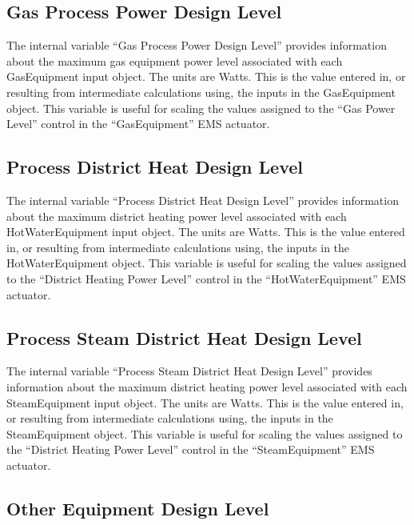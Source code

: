 \subsection{Gas Process Power Design Level}\label{gas-process-power-design-level}

The internal variable ``Gas Process Power Design Level'' provides information about the maximum gas equipment power level associated with each GasEquipment input object. The units are Watts. This is the value entered in, or resulting from intermediate calculations using, the inputs in the GasEquipment object. This variable is useful for scaling the values assigned to the ``Gas Power Level'' control in the ``GasEquipment'' EMS actuator.

\subsection{Process District Heat Design Level}\label{process-district-heat-design-level}

The internal variable ``Process District Heat Design Level'' provides information about the maximum district heating power level associated with each HotWaterEquipment input object. The units are Watts. This is the value entered in, or resulting from intermediate calculations using, the inputs in the HotWaterEquipment object. This variable is useful for scaling the values assigned to the ``District Heating Power Level'' control in the ``HotWaterEquipment'' EMS actuator.

\subsection{Process Steam District Heat Design Level}\label{process-steam-district-heat-design-level}

The internal variable ``Process Steam District Heat Design Level'' provides information about the maximum district heating power level associated with each SteamEquipment input object. The units are Watts. This is the value entered in, or resulting from intermediate calculations using, the inputs in the SteamEquipment object. This variable is useful for scaling the values assigned to the ``District Heating Power Level'' control in the ``SteamEquipment'' EMS actuator.

\subsection{Other Equipment Design Level}\label{other-equipment-design-level}


